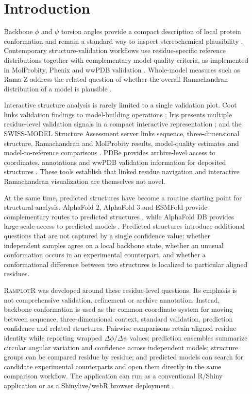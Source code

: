 \documentclass[11pt]{article}
\newcommand{\ramplotr}{\textsc{RamplotR}\xspace}
\begin{document}
\section{Introduction}

Backbone $\phi$ and $\psi$ torsion angles provide a compact description of local protein conformation and remain a standard way to inspect stereochemical plausibility \citep{Ramachandran1963}. Contemporary structure-validation workflows use residue-specific reference distributions together with complementary model-quality criteria, as implemented in MolProbity, Phenix and wwPDB validation \citep{Williams2018,Liebschner2019,Gore2017}. Whole-model measures such as Rama-Z address the related question of whether the overall Ramachandran distribution of a model is plausible \citep{Sobolev2020}.

Interactive structure analysis is rarely limited to a single validation plot. Coot links validation findings to model-building operations \citep{Emsley2010}; Iris presents multiple residue-level validation signals in a compact interactive representation \citep{Rochira2021}; and the SWISS-MODEL Structure Assessment server links sequence, three-dimensional structure, Ramachandran and MolProbity results, model-quality estimates and model-to-reference comparisons \citep{Waterhouse2024}. PDBe provides archive-level access to coordinates, annotations and wwPDB validation information for deposited structures \citep{Varadi2022PDBe}. These tools establish that linked residue navigation and interactive Ramachandran visualization are themselves not novel.

At the same time, predicted structures have become a routine starting point for structural analysis. AlphaFold 2, AlphaFold 3 and ESMFold provide complementary routes to predicted structures \citep{Jumper2021,Abramson2024,Lin2023}, while AlphaFold DB provides large-scale access to predicted models \citep{Varadi2024}. Predicted structures introduce additional questions that are not captured by a single confidence value: whether independent samples agree on a local backbone state, whether an unusual conformation occurs in an experimental counterpart, and whether a conformational difference between two structures is localized to particular aligned residues.

\ramplotr was developed around these residue-level questions. Its emphasis is not comprehensive validation, refinement or archive annotation. Instead, backbone conformation is used as the common coordinate system for moving between sequence, three-dimensional context, standard validation, prediction confidence and related structures. Pairwise comparisons retain aligned residue identity while reporting wrapped $\Delta\phi/\Delta\psi$ values; prediction ensembles summarize circular angular variation and confidence across independent models; structure groups can be compared residue by residue; and predicted models can search for candidate experimental counterparts and open them directly in the same comparison workflow. The application can run as a conventional R/Shiny application \citep{Shiny2026} or as a Shinylive/webR browser deployment \citep{Shinylive2026}.
\end{document}

